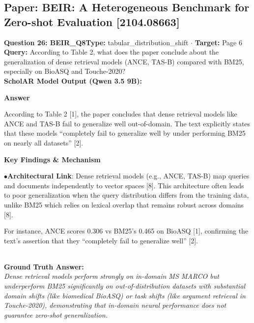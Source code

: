\documentclass[10pt,a4paper]{article}
\begin{document}
\subsection{Paper: BEIR: A Heterogeneous Benchmark for Zero-shot Evaluation [2104.08663]}
\vspace{-4pt}
\begin{tcolorbox}[questionbox]
{\noindent\bfseries\large\color{navy} Question 26: BEIR\_Q8}\hfill {\footnotesize\color{darkteal}\textbf{Type:} tabular\_distribution\_shift $\cdot$ \textbf{Target:} Page 6}\\[4pt]
{\noindent\bfseries\color{accentblue} Query: } According to Table 2, what does the paper conclude about the generalization of dense retrieval models (ANCE, TAS-B) compared with BM25, especially on BioASQ and Touche-2020?\\[6pt]
{\noindent\bfseries\color{navy} ScholAR Model Output (Qwen 3.5 9B):}\\[2pt]
{\small \noindent \textbf{Answer}\par\vspace{3pt}According to Table 2 [1], the paper concludes that dense retrieval models like ANCE and TAS-B fail to generalize well out-of-domain.   The text explicitly states that these models ``completely fail to generalize well by under performing BM25 on nearly all datasets'' [2].\par\vspace{3pt}\noindent \textbf{Key Findings \& Mechanism}\par\vspace{3pt}\noindent\hspace*{8pt}$\bullet$\hspace*{4pt}\textbf{Architectural Link}: Dense retrieval models (e.g., ANCE, TAS-B) map queries and documents independently to vector spaces [8]. This architecture often leads to poor generalization when the query distribution differs from the training data, unlike BM25 which relies on lexical overlap that remains robust across domains [8].\par\vspace{3pt}For instance, ANCE scores 0.306 vs BM25's 0.465 on BioASQ [1], confirming the text's assertion that they ``completely fail to generalize well'' [2].}\\[6pt]
{\noindent\bfseries\color{darkteal} Ground Truth Answer:}\\[2pt]
{\small\itshape Dense retrieval models perform strongly on in-domain MS MARCO but underperform BM25 significantly on out-of-distribution datasets with substantial domain shifts (like biomedical BioASQ) or task shifts (like argument retrieval in Touche-2020), demonstrating that in-domain neural performance does not guarantee zero-shot generalization.}\\[4pt]

\end{tcolorbox}
\end{document}
